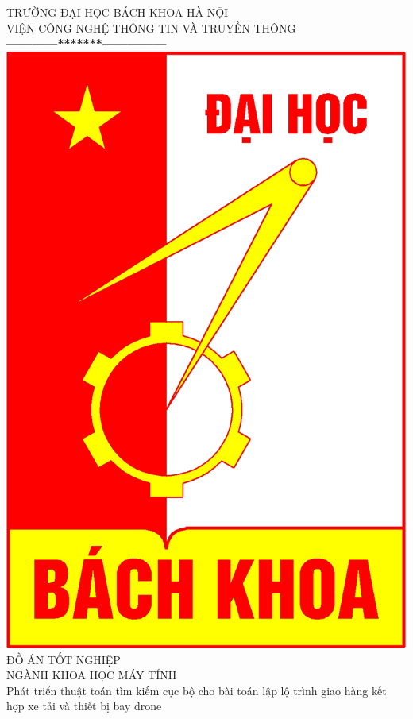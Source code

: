 \documentclass[a4paper,12pt]{report}
\begin{document}
\thispagestyle{empty}
\thisfancypage{
\setlength{\fboxrule}{1pt}
\doublebox}{}

\begin{center}
{\fontsize{16}{19}\selectfont TRƯỜNG ĐẠI HỌC BÁCH KHOA HÀ NỘI\\
VIỆN CÔNG NGHỆ THÔNG TIN VÀ TRUYỀN THÔNG}\\
\textbf{------------*******---------------}\\[1cm]
\includegraphics[scale=0.13]{hust.jpg}\\[1.3cm]
{\fontsize{23}{43}\selectfont ĐỒ ÁN TỐT NGHIỆP}\\[0.1cm]
{\fontsize{25}{10}\selectfont NGÀNH KHOA HỌC MÁY TÍNH}\\[0.9cm]
{\fontsize{20}{24}\selectfont Phát triển thuật toán tìm kiếm cục bộ cho bài toán lập lộ trình giao hàng kết hợp xe tải và thiết bị bay drone}\\[2cm]


\end{center}
\end{document}
